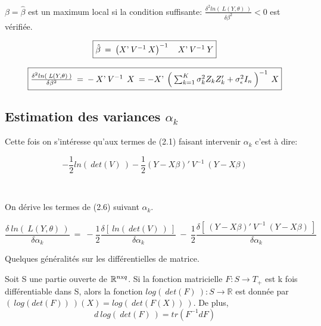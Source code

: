 \documentclass[11pt,fleqn]{book} %
\begin{document}
\vspace{1em}

$\beta=\hat{\beta}$ est un maximum local si la condition suffisante: $\frac{\delta^2 ln(\:\textit{L}(Y,\theta)\:)}{\delta\beta^2}<0$ est vérifiée.


\begin{equation} 
\fbox{$
\hat{\beta}\:=\:\left(  X\textnormal{'}\:V^{-1} \: X \right)^{-1} \quad X\textnormal{'} \:V^{-1}\: Y 
$}
\end{equation}

\begin{equation}
\fbox{$
\frac{\delta^2 ln(\:\textit{L}(Y,\theta)\:)}{\delta\beta^2} \:=\: -\: X\textnormal{'} \:V^{-1}\:\: X
\:= - X\textnormal{'} \: \left( \: \sum_{k=1}^{K} \sigma_k^2 Z_k Z_k'+\sigma_{\epsilon}^2 I_{n} \:\right)^{-1}\: X $}
\end{equation}

\vspace{2em} 


\subsection{Estimation des variances $\alpha_k$}

\vspace{2em}

Cette fois on s'intéresse qu'aux termes de (2.1) faisant intervenir $\alpha_k$ c'est à dire: 

\begin{equation}
-\frac{1}{2} ln(\:det(V)\:) -\frac{1}{2}  (Y-X\beta)'\:V^{-1}\:(Y-X\beta) 
\end{equation}

\

On dérive les termes de (2.6) suivant $\alpha_k$.

\begin{equation} 
\frac{\delta\: ln(\:\textit{L}(Y,\theta)\:) }{\delta \alpha_k} \:=\: -\frac{1}{2}  \frac{ \delta \left[\:ln(\:det(V)\:) \:\right] }{\delta \alpha_k} \:-\: \frac{1}{2}  \frac{\delta \left[\: (Y-X\beta)'\:V^{-1}\:(Y-X\beta)\:\right] }{\delta \alpha_k} 
\end{equation}

\newpage

Quelques généralités sur les différentielles de matrice. 

\vspace{1em}

\begin{theorem}
Soit S une partie ouverte de $\mathbb{R}^{n\textnormal{x}q}$. Si la fonction matricielle $F:S\rightarrow T_{+}$ est k fois différentiable dans S, alors la fonction $log(\:det(F)\:):S\rightarrow \mathbb{R}$ est donnée par $(\:log(det(F))\:)(X)=log(\:det(F(X))\:)$. De plus,
\[ d\:log(\:det(F)\:)=tr(F^{-1} dF) \]
\end{theorem}
\end{document}
